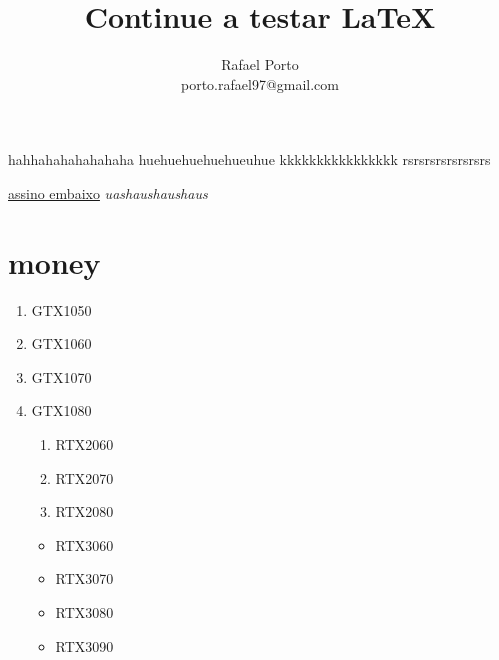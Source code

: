 \documentclass[12pt]{article}
\title{Continue a testar \LaTeX}
\author{Rafael Porto \\ porto.rafael97@gmail.com}
\begin{document}
 
\maketitle
hahhahahahahahaha
huehuehuehuehueuhue
kkkkkkkkkkkkkkkk
rsrsrsrsrsrsrsrs

\underline{assino embaixo} \it{uashaushaushaus}\par

\section{money}
\begin{enumerate} 
\item GTX1050
\item GTX1060
\item GTX1070
\item GTX1080
\begin{enumerate} 
\item RTX2060
\item RTX2070
\item RTX2080
\end{enumerate}
\begin{itemize} 
\item RTX3060
\item RTX3070
\item RTX3080
\item RTX3090
\end{itemize}
\end{enumerate}
\end{document}
